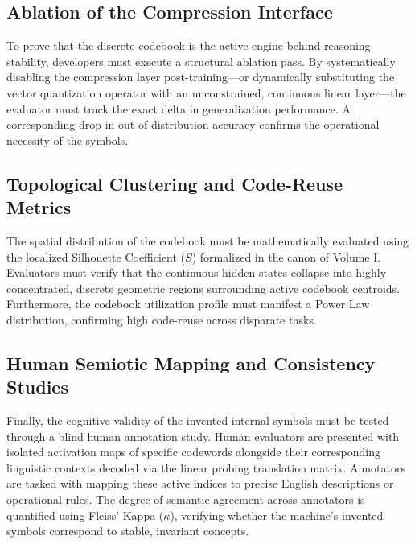 \subsection{Ablation of the Compression Interface}
To prove that the discrete codebook is the active engine behind reasoning stability, developers must execute a structural ablation pass. By systematically disabling the compression layer post-training—or dynamically substituting the vector quantization operator with an unconstrained, continuous linear layer—the evaluator must track the exact delta in generalization performance. A corresponding drop in out-of-distribution accuracy confirms the operational necessity of the symbols.

\subsection{Topological Clustering and Code-Reuse Metrics}
The spatial distribution of the codebook must be mathematically evaluated using the localized Silhouette Coefficient ($S$) formalized in the canon of Volume I. Evaluators must verify that the continuous hidden states collapse into highly concentrated, discrete geometric regions surrounding active codebook centroids. Furthermore, the codebook utilization profile must manifest a Power Law distribution, confirming high code-reuse across disparate tasks.

\subsection{Human Semiotic Mapping and Consistency Studies}
Finally, the cognitive validity of the invented internal symbols must be tested through a blind human annotation study. Human evaluators are presented with isolated activation maps of specific codewords alongside their corresponding linguistic contexts decoded via the linear probing translation matrix. Annotators are tasked with mapping these active indices to precise English descriptions or operational rules. The degree of semantic agreement across annotators is quantified using Fleiss' Kappa ($\kappa$), verifying whether the machine's invented symbols correspond to stable, invariant concepts.

% 
% 
